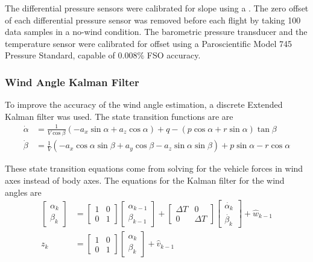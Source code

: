 The differential pressure sensors were calibrated for slope using a  . The zero offset of each differential pressure sensor was removed before each flight by taking 100 data samples in a no-wind condition. The barometric pressure transducer and the temperature sensor were calibrated for offset using a Paroscientific Model 745 Pressure Standard, capable of $0.008\%$ FSO accuracy\cite{pressureStandard}. 

\subsubsection*{Wind Angle Kalman Filter}

To improve the accuracy of the wind angle estimation, a discrete Extended Kalman filter was used. The state transition functions are are
\begin{align}
\dot{\alpha} & = \frac{1}{V\cos\beta}(-a_x\sin\alpha+a_z\cos\alpha)+q-(p\cos\alpha+r\sin\alpha)\tan\beta\\
\dot{\beta} &=\frac{1}{V}(-a_x\cos\alpha\sin\beta+a_y\cos\beta-a_z\sin\alpha\sin\beta)+p\sin\alpha-r\cos\alpha
\end{align}

These state transition equations come from solving for the vehicle forces in wind axes instead of body axes\cite{klein2006aircraft}. The equations for the Kalman filter for the wind angles are
\begin{align}
\begin{bmatrix}
\alpha_k\\\beta_k
\end{bmatrix} &= \begin{bmatrix}
1& 0\\0&1
\end{bmatrix}\begin{bmatrix}
\alpha_{k-1}\\\beta_{k-1}
\end{bmatrix}+\begin{bmatrix}
\Delta T& 0\\0&\Delta T
\end{bmatrix}\begin{bmatrix}
\dot{\alpha_{k}}\\\dot{\beta_{k}}
\end{bmatrix}+\hat{w}_{k-1}\\
z_k & = \begin{bmatrix}
1 & 0\\0&1
\end{bmatrix}\begin{bmatrix}
\alpha_{k}\\
\beta_{k}
\end{bmatrix}+\hat{v}_{k-1}
\end{align}

